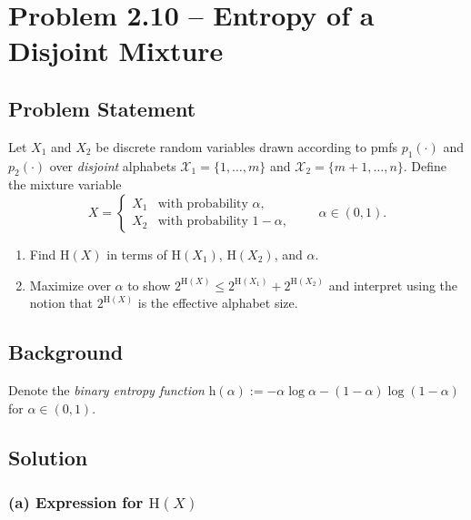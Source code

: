 \documentclass[12pt,a4paper]{article}
\theoremstyle{plain}
\theoremstyle{definition}
\theoremstyle{remark}
\newcommand{\HH}{\mathrm{H}}
\newcommand{\hb}{\mathrm{h}}          %
\begin{document}
\newpage
\section{Problem 2.10 – Entropy of a Disjoint Mixture}

\subsection*{Problem Statement}

Let $X_1$ and $X_2$ be discrete random variables drawn according to pmfs
$p_1(\cdot)$ and $p_2(\cdot)$ over \emph{disjoint} alphabets
$\mathcal{X}_1 = \{1,\dots,m\}$ and $\mathcal{X}_2 = \{m+1,\dots,n\}$.
Define the mixture variable
\[
  X = \begin{cases}
    X_1 & \text{with probability } \alpha,\\
    X_2 & \text{with probability } 1-\alpha,
  \end{cases}
  \qquad \alpha\in(0,1).
\]

\begin{enumerate}[label=\textbf{(\alph*)}]
  \item Find $\HH(X)$ in terms of $\HH(X_1)$, $\HH(X_2)$, and $\alpha$.
  \item Maximize over $\alpha$ to show $2^{\HH(X)} \le 2^{\HH(X_1)} + 2^{\HH(X_2)}$
        and interpret using the notion that $2^{\HH(X)}$ is the effective alphabet size.
\end{enumerate}

\subsection*{Background}

Denote the \emph{binary entropy function}
$\hb(\alpha) := -\alpha\log\alpha - (1-\alpha)\log(1-\alpha)$ for
$\alpha\in(0,1)$.

\subsection*{Solution}

\subsubsection*{(a) Expression for $\HH(X)$}
\end{document}
